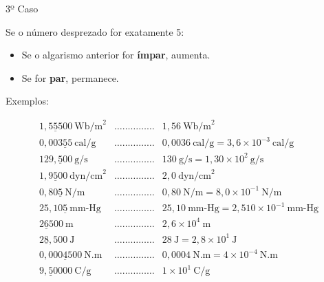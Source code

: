 \documentclass[aspectratio=169,10pt]{beamer}
\begin{document}
\begin{frame}{3º Caso}

Se o número desprezado for exatamente 5:

\begin{itemize}
\item Se o algarismo anterior for \textbf{ímpar}, aumenta.
\item Se for \textbf{par}, permanece.
\end{itemize}

Exemplos:



\[
\begin{array}{lcl}
1,5\underline{5}500\ \text{Wb/m}^2 & \ldots\ldots\ldots\ldots\ldots & 1,56\ \text{Wb/m}^2 \\

0,003\underline{5}5\ \text{cal/g} & \ldots\ldots\ldots\ldots\ldots & 
0,0036\ \text{cal/g} = 3,6\times10^{-3}\ \text{cal/g} \\

129,\underline{5}00\ \text{g/s} & \ldots\ldots\ldots\ldots\ldots & 
130\ \text{g/s} = 1,30\times10^{2}\ \text{g/s} \\

1,9\underline{5}00\ \text{dyn/cm}^2 & \ldots\ldots\ldots\ldots\ldots & 
2,0\ \text{dyn/cm}^2 \\

0,80\underline{5}\ \text{N/m} & \ldots\ldots\ldots\ldots\ldots & 
0,80\ \text{N/m} = 8,0\times10^{-1}\ \text{N/m} \\

25,10\underline{5}\ \text{mm-Hg} & \ldots\ldots\ldots\ldots\ldots & 
25,10\ \text{mm-Hg} = 2,510\times10^{-1}\ \text{mm-Hg} \\

2\underline{6}500\ \text{m} & \ldots\ldots\ldots\ldots\ldots & 
2,6\times10^{4}\ \text{m} \\

2\underline{8},500\ \text{J} & \ldots\ldots\ldots\ldots\ldots & 
28\ \text{J} = 2,8\times10^{1}\ \text{J} \\

0,000\underline{4}500\ \text{N.m} & \ldots\ldots\ldots\ldots\ldots & 
0,0004\ \text{N.m} = 4\times10^{-4}\ \text{N.m} \\

9,\underline{5}0000\ \text{C/g} & \ldots\ldots\ldots\ldots\ldots & 
1\times10^{1}\ \text{C/g}
\end{array}
\]



\end{frame}
\end{document}
